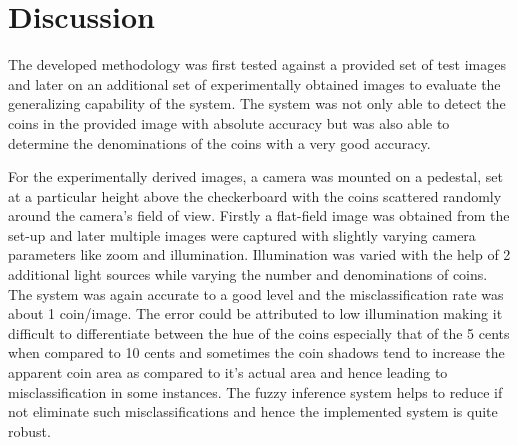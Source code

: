 \documentclass[report.tex]{subfile}
\begin{document}
\section{Discussion}

The developed methodology was first tested against a provided set of test images and later on an additional set of experimentally obtained images to evaluate the generalizing capability of the system. The system was not only able to detect the coins in the provided image with absolute accuracy but was also able to determine the denominations of the coins with a very good accuracy. 

For the experimentally derived images, a camera was mounted on a pedestal, set at a particular height above the checkerboard with the coins scattered randomly around the camera's field of view. Firstly a flat-field image was obtained from the set-up and later multiple images were captured with slightly varying camera parameters like zoom and illumination. Illumination was varied with the help of 2 additional light sources while varying the number and denominations of coins. The system was again accurate to a good level and the misclassification rate was about 1 coin/image. The error could be attributed to low illumination making it difficult to differentiate between the hue of the coins especially that of the 5 cents when compared to 10 cents and sometimes the coin shadows tend to increase the apparent coin area as compared to it's actual area and hence leading to misclassification in some instances. The fuzzy inference system helps to reduce if not eliminate such misclassifications and hence the implemented system is quite robust.
\end{document}
